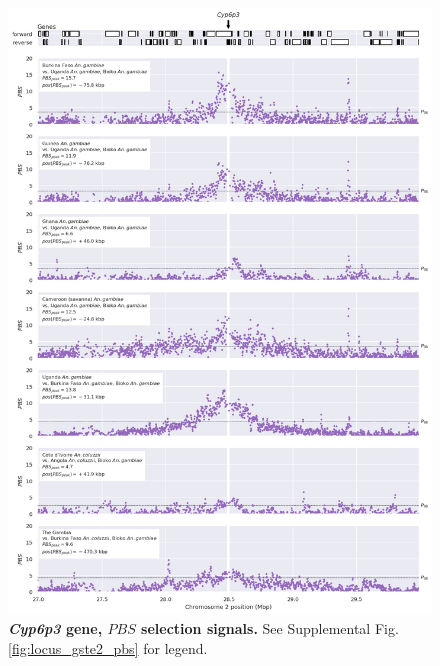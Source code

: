 \documentclass[a4paper,11pt,abstracton,hidelinks]{scrartcl}
\begin{document}
\clearpage
\begin{figure}[t!]
	\begin{center}
		\includegraphics*[width=1\linewidth,center]{artwork/locus_cyp6p3_pbs_pdist.png}
	\end{center}
	\caption[\textit{Cyp6p3} gene, $PBS$ selection signals]{
	\textbf{\textit{Cyp6p3} gene, $PBS$ selection signals.} 
	See Supplemental Fig. \ref{fig:locus_gste2_pbs} for legend.
	} 
	\label{fig:locus_cyp6p3_pbs}
\end{figure}


\clearpage
\end{document}
